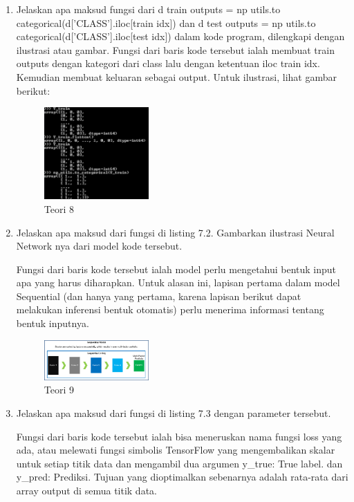\begin{enumerate}
	\item Jelaskan apa maksud fungsi dari d train outputs = np utils.to categorical(d[’CLASS’].iloc[train idx]) dan d test outputs = np utils.to categorical(d[’CLASS’].iloc[test idx]) dalam kode program, dilengkapi dengan ilustrasi atau gambar.
	\hfill\break
	Fungsi dari baris kode tersebut ialah membuat train outputs dengan kategori dari class lalu dengan ketentuan iloc train idx. Kemudian membuat keluaran sebagai output. Untuk ilustrasi, lihat gambar berikut: 

	\begin{figure}[H]
	\centering
		\includegraphics[width=4cm]{figures/1174070/7/materi/teori8.PNG}
		\caption{Teori 8}
	\end{figure}

	\item Jelaskan apa maksud dari fungsi di listing 7.2. Gambarkan ilustrasi Neural Network nya dari model kode tersebut.
	\hfill\break

	

	Fungsi dari baris kode tersebut ialah model perlu mengetahui bentuk input apa yang harus diharapkan. Untuk alasan ini, lapisan pertama dalam model Sequential (dan hanya yang pertama, karena lapisan berikut dapat melakukan inferensi bentuk otomatis) perlu menerima informasi tentang bentuk inputnya.

	\begin{figure}[H]
	\centering
		\includegraphics[width=4cm]{figures/1174070/7/materi/teori9.PNG}
		\caption{Teori 9}
	\end{figure}

	\item Jelaskan apa maksud dari fungsi di listing 7.3 dengan parameter tersebut.
	\hfill\break

	

	Fungsi dari baris kode tersebut ialah bisa meneruskan nama fungsi loss yang ada, atau melewati fungsi simbolis TensorFlow yang mengembalikan skalar untuk setiap titik data dan mengambil dua argumen y\_true: True label. dan  y\_pred: Prediksi. Tujuan yang dioptimalkan sebenarnya adalah rata-rata dari array output di semua titik data.


\end{enumerate}
